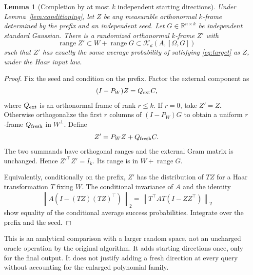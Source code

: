 \documentclass[11pt]{article}
\newtheorem{lemma}[theorem]{Lemma}
\theoremstyle{definition}
\newcommand{\R}{\mathbb R}
\newcommand{\ran}{\operatorname{range}}
\newcommand{\norm}[1]{\left\lVert#1\right\rVert}
\newcommand{\K}{\mathcal K}
\begin{document}
\begin{lemma}[Completion by at most $k$ independent starting directions]\label{lem:completion}
Under Lemma~\ref{lem:conditioning}, let $Z$ be any measurable orthonormal $k$-frame determined by the prefix and an independent seed. Let $G\in\R^{n\times k}$ be independent standard Gaussian. There is a randomized orthonormal $k$-frame $Z'$ with
\[
\ran Z'\subset W+\ran G\subset\K_d(A,[\Omega,G])
\]
such that $Z'$ has exactly the same average probability of satisfying \eqref{eq:target} as $Z$, under the Haar input law.
\end{lemma}
\begin{proof}
Fix the seed and condition on the prefix. Factor the external component as
\[
(I-P_W)Z=Q_{\rm ext}C,
\]
where $Q_{\rm ext}$ is an orthonormal frame of rank $r\le k$. If $r=0$, take $Z'=Z$. Otherwise orthogonalize the first $r$ columns of $(I-P_W)G$ to obtain a uniform $r$-frame $Q_{\rm fresh}$ in $W^\perp$. Define
\[
Z'=P_WZ+Q_{\rm fresh}C.
\]
The two summands have orthogonal ranges and the external Gram matrix is unchanged. Hence $Z'^\top Z'=I_k$. Its range is in $W+\ran G$.

Equivalently, conditionally on the prefix, $Z'$ has the distribution of $TZ$ for a Haar transformation $T$ fixing $W$. The conditional invariance of $A$ and the identity
\[
\norm{A(I-(TZ)(TZ)^\top)}_2
=\norm{T^\top AT(I-ZZ^\top)}_2
\]
show equality of the conditional average success probabilities. Integrate over the prefix and the seed.
\end{proof}

This is an analytical comparison with a larger random space, not an uncharged oracle operation by the original algorithm. It adds starting directions once, only for the final output. It does not justify adding a fresh direction at every query without accounting for the enlarged polynomial family.
\end{document}
